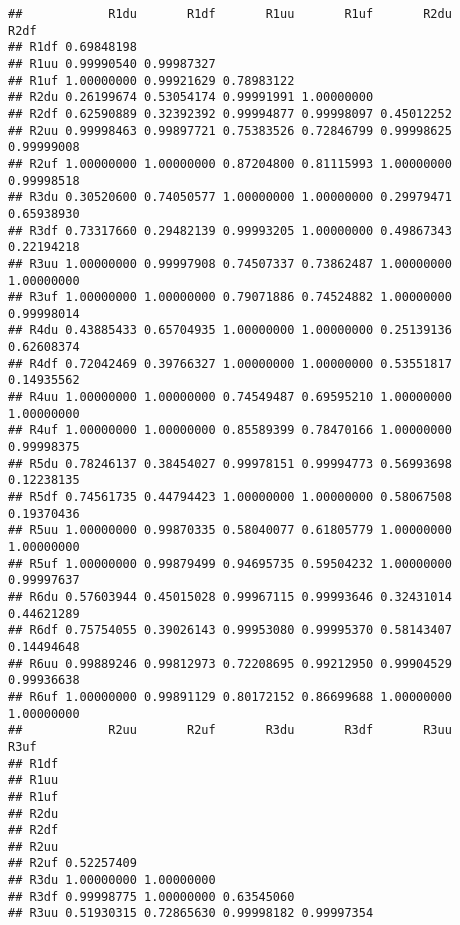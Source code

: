 \documentclass[
]{article}
\begin{document}
\begin{verbatim}
##            R1du       R1df       R1uu       R1uf       R2du       R2df
## R1df 0.69848198                                                       
## R1uu 0.99990540 0.99987327                                            
## R1uf 1.00000000 0.99921629 0.78983122                                 
## R2du 0.26199674 0.53054174 0.99991991 1.00000000                      
## R2df 0.62590889 0.32392392 0.99994877 0.99998097 0.45012252           
## R2uu 0.99998463 0.99897721 0.75383526 0.72846799 0.99998625 0.99999008
## R2uf 1.00000000 1.00000000 0.87204800 0.81115993 1.00000000 0.99998518
## R3du 0.30520600 0.74050577 1.00000000 1.00000000 0.29979471 0.65938930
## R3df 0.73317660 0.29482139 0.99993205 1.00000000 0.49867343 0.22194218
## R3uu 1.00000000 0.99997908 0.74507337 0.73862487 1.00000000 1.00000000
## R3uf 1.00000000 1.00000000 0.79071886 0.74524882 1.00000000 0.99998014
## R4du 0.43885433 0.65704935 1.00000000 1.00000000 0.25139136 0.62608374
## R4df 0.72042469 0.39766327 1.00000000 1.00000000 0.53551817 0.14935562
## R4uu 1.00000000 1.00000000 0.74549487 0.69595210 1.00000000 1.00000000
## R4uf 1.00000000 1.00000000 0.85589399 0.78470166 1.00000000 0.99998375
## R5du 0.78246137 0.38454027 0.99978151 0.99994773 0.56993698 0.12238135
## R5df 0.74561735 0.44794423 1.00000000 1.00000000 0.58067508 0.19370436
## R5uu 1.00000000 0.99870335 0.58040077 0.61805779 1.00000000 1.00000000
## R5uf 1.00000000 0.99879499 0.94695735 0.59504232 1.00000000 0.99997637
## R6du 0.57603944 0.45015028 0.99967115 0.99993646 0.32431014 0.44621289
## R6df 0.75754055 0.39026143 0.99953080 0.99995370 0.58143407 0.14494648
## R6uu 0.99889246 0.99812973 0.72208695 0.99212950 0.99904529 0.99936638
## R6uf 1.00000000 0.99891129 0.80172152 0.86699688 1.00000000 1.00000000
##            R2uu       R2uf       R3du       R3df       R3uu       R3uf
## R1df                                                                  
## R1uu                                                                  
## R1uf                                                                  
## R2du                                                                  
## R2df                                                                  
## R2uu                                                                  
## R2uf 0.52257409                                                       
## R3du 1.00000000 1.00000000                                            
## R3df 0.99998775 1.00000000 0.63545060                                 
## R3uu 0.51930315 0.72865630 0.99998182 0.99997354                      

\end{verbatim}
\end{document}
